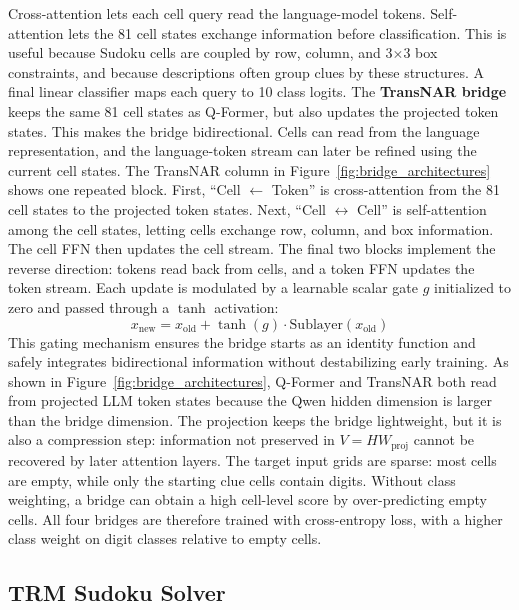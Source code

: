 \documentclass[11pt]{article}
\begin{document}
Cross-attention lets each cell query read the language-model tokens.
Self-attention lets the 81 cell states exchange information before classification.
This is useful because Sudoku cells are coupled by row, column, and 3$\times$3 box constraints, and because descriptions often group clues by these structures.
A final linear classifier maps each query to 10 class logits.
The \textbf{TransNAR bridge} \cite{bounsiTransformersMeetNeural2024} keeps the same 81 cell states as Q-Former, but also updates the projected token states.
This makes the bridge bidirectional.
Cells can read from the language representation, and the language-token stream can later be refined using the current cell states.
The TransNAR column in Figure~\ref{fig:bridge_architectures} shows one repeated block.
First, ``Cell $\leftarrow$ Token'' is cross-attention from the 81 cell states to the projected token states.
Next, ``Cell $\leftrightarrow$ Cell'' is self-attention among the cell states, letting cells exchange row, column, and box information.
The cell FFN then updates the cell stream.
The final two blocks implement the reverse direction: tokens read back from cells, and a token FFN updates the token stream.
Each update is modulated by a learnable scalar gate $g$ initialized to zero and passed through a $\tanh$ activation:
\begin{equation}
x_{\text{new}} = x_{\text{old}} + \tanh(g) \cdot \text{Sublayer}(x_{\text{old}})
\end{equation}
This gating mechanism ensures the bridge starts as an identity function and safely integrates bidirectional information without destabilizing early training.
As shown in Figure~\ref{fig:bridge_architectures}, Q-Former and TransNAR both read from projected LLM token states because the Qwen hidden dimension is larger than the bridge dimension.
The projection keeps the bridge lightweight, but it is also a compression step: information not preserved in $V = H W_{\text{proj}}$ cannot be recovered by later attention layers.
The target input grids are sparse: most cells are empty, while only the starting clue cells contain digits.
Without class weighting, a bridge can obtain a high cell-level score by over-predicting empty cells.
All four bridges are therefore trained with cross-entropy loss, with a higher class weight on digit classes relative to empty cells.
\subsection{TRM Sudoku Solver}
\label{sec:trm_specialist}
\end{document}
